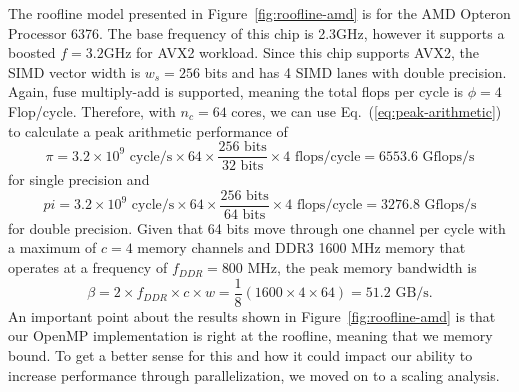 \documentclass[12pt]{article}
\begin{document}
The roofline model presented in Figure~\ref{fig:roofline-amd} is for the AMD Opteron Processor 6376. The base frequency of this chip is 2.3GHz, however it supports a boosted $f = 3.2$GHz for AVX2 workload. Since this chip supports AVX2, the SIMD vector width is $w_s = 256$ bits and has 4 SIMD lanes with double precision. Again, fuse multiply-add is supported, meaning the total flops per cycle is $\phi = 4$ Flop/cycle. Therefore, with $n_c=64$ cores, we can use Eq.~(\ref{eq:peak-arithmetic}) to calculate a peak arithmetic performance of
\begin{equation}
    \pi = 3.2 \times 10^9 \mbox{ cycle/s} \times 64 \times \frac{256 \mbox{ bits}}{32 \mbox{ bits}} \times 4 \mbox{ flops/cycle}  = 6553.6 \mbox{ Gflops/s}
\end{equation}
for single precision and
\begin{equation}
    pi = 3.2 \times 10^9 \mbox{ cycle/s} \times 64 \times \frac{256 \mbox{ bits}}{64 \mbox{ bits}} \times 4 \mbox{ flops/cycle}  = 3276.8 \mbox{ Gflops/s}
\end{equation}
for double precision. Given that 64 bits move through one channel per cycle with a maximum of $c=4$ memory channels and DDR3 1600 MHz memory that operates at a frequency of $f_{DDR} = 800$ MHz, the peak memory bandwidth is
\begin{equation}
    \beta = 2 \times f_{DDR} \times c \times w = \frac{1}{8}(1600 \times 4 \times 64) =  51.2 \mbox{ GB/s}.
\end{equation}
An important point about the results shown in Figure~\ref{fig:roofline-amd} is that our OpenMP implementation is right at the roofline, meaning that we memory bound. To get a better sense for this and how it could impact our ability to increase performance through parallelization, we moved on to a scaling analysis.
\end{document}
